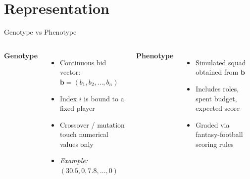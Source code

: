 \documentclass[aspectratio=169]{beamer}
\newcommand{\bids}{\mathbf{b}}
\begin{document}
	
	
	
	\section{Representation}
	\begin{frame}{Genotype vs Phenotype}
		\begin{columns}[T,onlytextwidth]
\textbf{Genotype}
\begin{itemize}
	\item Continuous bid vector: $\bids = (b_1, b_2, \dots, b_n)$
	\item Index \(i\) is bound to a fixed player
	\item Crossover / mutation touch numerical values only
	\item \textit{Example: } $(30.5, 0, 7.8, \dots, 0)$
\end{itemize}

			
			\textbf{Phenotype}
			\begin{itemize}
				\item Simulated squad obtained from \(\bids\)
				\item Includes roles, spent budget, expected score
				\item Graded via fantasy-football scoring rules
			\end{itemize}
		\end{columns}
	\end{frame}
	

	
\end{document}
